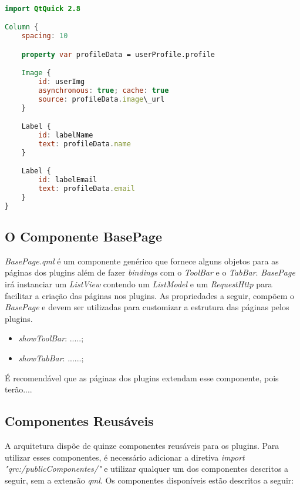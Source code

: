 \begin{center}
\begin{lstlisting}[language=qml]

import QtQuick 2.8

Column {
	spacing: 10

	property var profileData = userProfile.profile

	Image {
		id: userImg
		asynchronous: true; cache: true
		source: profileData.image\_url
	}

	Label {
		id: labelName
		text: profileData.name
	}

	Label {
		id: labelEmail
		text: profileData.email
	}
}
\end{lstlisting}
\end{center}


\subsection{O Componente BasePage}\label{sec:solucao-desenvolvida}
\textit{BasePage.qml} é um componente genérico que fornece alguns objetos para as páginas dos plugins além de fazer \textit{bindings} com o \textit{ToolBar} e o \textit{TabBar}. \textit{BasePage} irá instanciar um \textit{ListView} contendo um \textit{ListModel} e um \textit{RequestHttp} para facilitar a criação das páginas nos plugins. As propriedades a seguir, compõem o \textit{BasePage} e devem ser utilizadas para customizar a estrutura das páginas pelos plugins.

\begin{itemize}
	\item \textit{showToolBar}: .....;
	\item \textit{showTabBar}: ......;
\end{itemize}

É recomendável que as páginas dos plugins extendam esse componente, pois terão....

\subsection{Componentes Reusáveis}\label{sec:solucao-desenvolvida}
A arquitetura dispõe de quinze componentes reusáveis para os plugins. Para utilizar esses componentes, é necessário adicionar a diretiva \textit{import "qrc:/publicComponentes/"} e utilizar qualquer um dos componentes descritos a seguir, sem a extensão \textit{qml}. Os componentes disponíveis estão descritos a seguir:

